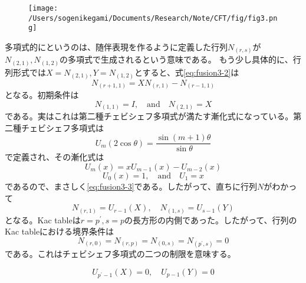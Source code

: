 \documentclass[11pt, aps, longbibliography]{article}
\numberwithin{equation}{section}
\begin{document}
        \begin{figure}[t]
            \centering
            \texttt{[image: /Users/sogenikegami/Documents/Research/Note/CFT/fig/fig3.png]}
            \caption{}
            \label{fig3}
        \end{figure}

        多項式的にというのは、随伴表現を作るように定義した行列$N_{(r,s)}$が$N_{(2,1)},N_{(1,2)}$の多項式で生成されるという意味である。
        もう少し具体的に、行列形式では$X=N_{(2,1)},Y=N_{(1,2)}$とすると、式\eqref{eq:fusion3-2}は
        \begin{equation}\label{eq:fusion3-3}
            N_{(r+1,1)} = XN_{(r,1)} - N_{(r-1,1)}
        \end{equation}
        となる。初期条件は
        \begin{equation}\label{eq:fusion3-4}
            N_{(1,1)} = I, \quad \text{and} \quad N_{(2,1)} = X
        \end{equation}
        である。実はこれは第二種チェビシェフ多項式が満たす漸化式になっている。第二種チェビシェフ多項式は
        \begin{equation}\label{eq:fusion3-5}
            U_m(2\cos \theta) = \frac{\sin(m+1)\theta}{\sin \theta}
        \end{equation}
        で定義され、その漸化式は
        \begin{equation}\label{eq:fusion3-6}
            U_m(x) = xU_{m-1}(x) - U_{m-2}(x)
        \end{equation}
        \begin{equation}
            U_0(x) = 1, \quad \text{and} \quad U_1 = x
        \end{equation}
        であるので、まさしく\eqref{eq:fusion3-3}である。したがって、直ちに行列$N$がわかって
        \begin{equation}\label{eq:fusion3-7}
            N_{(r,1)} = U_{r-1}(X), \quad N_{(1,s)} = U_{s-1}(Y)
        \end{equation}
        となる。Kac tableは$r=p^\prime, s=p$の長方形の内側であった。したがって、行列のKac tableにおける境界条件は
        \begin{equation}\label{eq:fusion3-8}
            N_{(r,0)} = N_{(r,p)} = N_{(0,s)} = N_{(p^\prime,s)} = 0
        \end{equation}
        である。これはチェビシェフ多項式の二つの制限を意味する。
        \begin{tcolorbox}
            \begin{equation}\label{eq:fusion3-9}
                U_{p^\prime -1}(X) = 0, \quad U_{p-1}(Y) = 0
            \end{equation}
        \end{tcolorbox}
\end{document}
